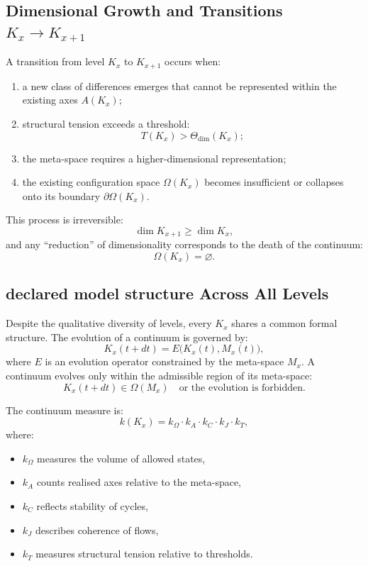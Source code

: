 \subsection{Dimensional Growth and Transitions $K_x \to K_{x+1}$}

A transition from level $K_x$ to $K_{x+1}$ occurs when:
\begin{enumerate}
    \item a new class of differences emerges that cannot be represented
          within the existing axes $A(K_x)$;
    \item structural tension exceeds a threshold:
    \[
        T(K_x) > \Theta_{\mathrm{dim}}(K_x);
    \]
    \item the meta-space requires a higher-dimensional representation;
    \item the existing configuration space $\Omega(K_x)$ becomes
          insufficient or collapses onto its boundary $\partial\Omega(K_x)$.
\end{enumerate}

This process is irreversible:
\[
\dim K_{x+1} \ge \dim K_x,
\]
and any ``reduction'' of dimensionality corresponds to the death of the
continuum:
\[
\Omega(K_x) = \varnothing.
\]


\subsection{declared model structure Across All Levels}

Despite the qualitative diversity of levels, every $K_x$ shares a common
formal structure.
The evolution of a continuum is governed by:
\[
K_x(t + dt) = E\bigl(K_x(t), M_x(t)\bigr),
\]
where $E$ is an evolution operator constrained by the meta-space
$M_x$.
A continuum evolves only within the admissible region of its
meta-space:
\[
K_x(t+dt) \in \Omega(M_x)
\quad\text{or the evolution is forbidden}.
\]

The continuum measure is:
\[
k(K_x) =
k_{\Omega} \cdot k_{A} \cdot k_{C} \cdot k_{J} \cdot k_{T},
\]
where:
\begin{itemize}
    \item $k_{\Omega}$ measures the volume of allowed states,
    \item $k_{A}$ counts realised axes relative to the meta-space,
    \item $k_{C}$ reflects stability of cycles,
    \item $k_{J}$ describes coherence of flows,
    \item $k_{T}$ measures structural tension relative to thresholds.
\end{itemize}



